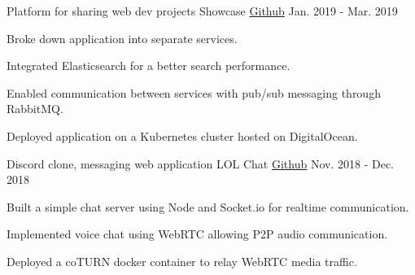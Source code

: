 

\begin{cventries}

  \cventry
    {Platform for sharing web dev projects} %
    {Showcase} %
    {
      \href{https://github.com/bernardjkim/showcase}{Github}
    } %
    {Jan. 2019 - Mar. 2019} %
    {
      \begin{cvitems} %
        \item {Broke down application into separate services.}
        \item {Integrated Elasticsearch for a better search performance.}
        \item {Enabled communication between services with pub/sub messaging through RabbitMQ.}
        \item {Deployed application on a Kubernetes cluster hosted on DigitalOcean.}
      \end{cvitems}
    }

  \cventry
    {Discord clone, messaging web application} %
    {LOL Chat} %
    {
      \href{https://github.com/bernardjkim/lol-chat}{Github}
    } %
    {Nov. 2018 - Dec. 2018} %
    {
      \begin{cvitems} %
        \item {Built a simple chat server using Node and Socket.io for realtime communication.}
        \item {Implemented voice chat using WebRTC allowing P2P audio communication.}
        \item {Deployed a coTURN docker container to relay WebRTC media traffic.}
      \end{cvitems}
    }


\end{cventries}
